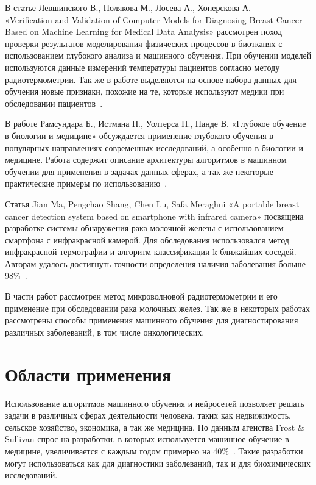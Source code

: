 В статье Левшинского В., Полякова М., Лосева А., Хоперскова А. \\ «Verification and Validation of Computer Models for Diagnosing Breast Cancer Based on Machine Learning for Medical Data Analysis» рассмотрен поход проверки результатов моделирования физических процессов в биотканях с использованием глубокого анализа и машинного обучения. При обучении моделей используются данные измерений температуры пациентов согласно методу радиотермометрии. Так же в работе выделяются на основе набора данных для обучения новые признаки, похожие на те, которые используют медики при обследовании пациентов~\cite{lev-polyakov-losev-hoperskov}.


В работе Рамсундара Б., Истмана П., Уолтерса П., Панде В. «Глубокое обучение в биологии и медицине» обсуждается применение глубокого обучения в популярных направлениях современных исследований, а особенно в биологии и медицине. Работа содержит описание архитектуры алгоритмов в машинном обучении для применения в задачах данных сферах, а так же некоторые практические примеры по использованию~\cite{ramsundar-deep-learning}.


Статья Jian Ma, Pengchao Shang, Chen Lu, Safa Meraghni «A portable breast cancer detection system based on smartphone with infrared camera» посвящена разработке системы обнаружения рака молочной железы с использованием смартфона с инфракрасной камерой. Для обследования использовался метод инфракрасной термографии и алгоритм классификации k-ближайших соседей. Авторам удалось достигнуть точности определения наличия заболевания больше 98\%~\cite{mobile-breast-cancer-detection}.


В части работ рассмотрен метод микроволновой радиотермометрии и его применение при обследовании рака молочных желез. Так же в некоторых работах рассмотрены способы применения машинного обучения для диагностирования различных заболеваний, в том числе онкологических.

\section{Области применения}

Использование алгоритмов машинного обучения и нейросетей позволяет решать задачи в различных сферах деятельности человека, таких как недвижимость, сельское хозяйство, экономика, а так же медицина. По данным агенства Frost \& Sullivan спрос на разработки, в которых используется машинное обучение в медицине, увеличивается с каждым годом примерно на 40\%~\cite{habrbigdatamedicine}. Такие разработки могут использоваться как для диагностики заболеваний, так  и для биохимических исследований.


